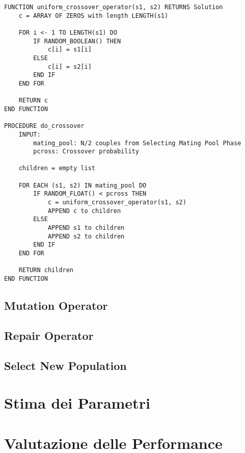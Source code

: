 \begin{minipage}{\textwidth}
    \begin{lstlisting}
FUNCTION uniform_crossover_operator(s1, s2) RETURNS Solution
    c = ARRAY OF ZEROS with length LENGTH(s1)

    FOR i <- 1 TO LENGTH(s1) DO
        IF RANDOM_BOOLEAN() THEN
            c[i] = s1[i]
        ELSE
            c[i] = s2[i]
        END IF
    END FOR

    RETURN c
END FUNCTION

PROCEDURE do_crossover
    INPUT:
        mating_pool: N/2 couples from Selecting Mating Pool Phase
        pcross: Crossover probability

    children = empty list

    FOR EACH (s1, s2) IN mating_pool DO
        IF RANDOM_FLOAT() < pcross THEN
            c = uniform_crossover_operator(s1, s2)
            APPEND c to children
        ELSE
            APPEND s1 to children
            APPEND s2 to children
        END IF
    END FOR

    RETURN children
END FUNCTION
\end{lstlisting}
\end{minipage}

\subsection{Mutation Operator}

\subsection{Repair Operator}
\subsection{Select New Population}

\section{Stima dei Parametri}
\section{Valutazione delle Performance}

